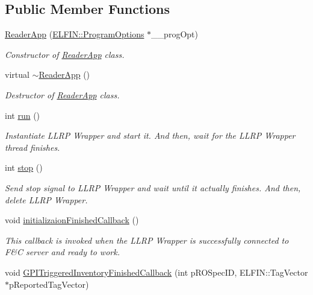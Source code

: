 \subsection*{Public Member Functions}
\begin{DoxyCompactItemize}
\item 
\hyperlink{class_reader_app_a151ab4039b8f25f5f7b27998a5f5c3e1}{Reader\-App} (\hyperlink{class_e_l_f_i_n_1_1_program_options}{E\-L\-F\-I\-N\-::\-Program\-Options} $\ast$\-\_\-\-\_\-prog\-Opt)
\begin{DoxyCompactList}\small\item\em Constructor of \hyperlink{class_reader_app}{Reader\-App} class. \end{DoxyCompactList}\item 
virtual \hyperlink{class_reader_app_a3a4756d7a580f364dd00e7c58c9b1828}{$\sim$\-Reader\-App} ()
\begin{DoxyCompactList}\small\item\em Destructor of \hyperlink{class_reader_app}{Reader\-App} class. \end{DoxyCompactList}\item 
int \hyperlink{class_reader_app_a9c597f4245e523a0261304bb5780b492}{run} ()
\begin{DoxyCompactList}\small\item\em Instantiate L\-L\-R\-P Wrapper and start it. And then, wait for the L\-L\-R\-P Wrapper thread finishes. \end{DoxyCompactList}\item 
int \hyperlink{class_reader_app_aa2ff06a65b426f938a6443ed4fd822be}{stop} ()
\begin{DoxyCompactList}\small\item\em Send stop signal to L\-L\-R\-P Wrapper and wait until it actually finishes. And then, delete L\-L\-R\-P Wrapper. \end{DoxyCompactList}\item 
void \hyperlink{class_reader_app_a9188fcc8bb91a42d0568d9f4fc72c3d3}{initializaion\-Finished\-Callback} ()
\begin{DoxyCompactList}\small\item\em This callback is invoked when the L\-L\-R\-P Wrapper is successfully connected to F\&C server and ready to work. \end{DoxyCompactList}\item 
void \hyperlink{class_reader_app_af303ef50ad88ff71262cc37963720715}{G\-P\-I\-Triggered\-Inventory\-Finished\-Callback} (int p\-R\-O\-Spec\-I\-D, E\-L\-F\-I\-N\-::\-Tag\-Vector $\ast$p\-Reported\-Tag\-Vector)

\end{DoxyCompactItemize}
